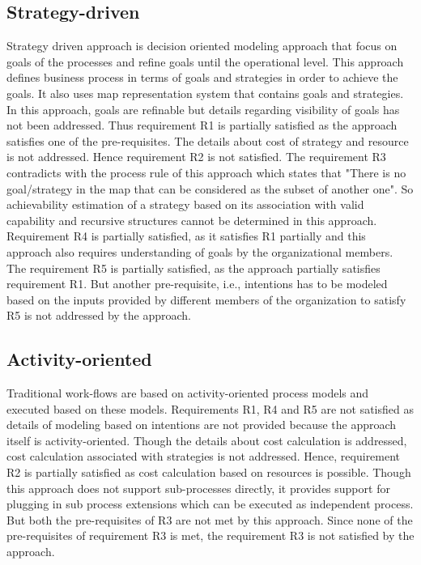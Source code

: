 \subsection{Strategy-driven} 
Strategy driven approach is decision oriented modeling approach that focus on goals of the processes and refine goals until the operational level. This approach defines business process in terms of goals and strategies in order to achieve the goals. It also uses map representation system that contains goals and strategies. In this approach, goals are refinable but details regarding visibility of goals has not been addressed. Thus requirement R1 is partially satisfied as the approach satisfies one of the pre-requisites. The details about cost of strategy and resource is not addressed. Hence requirement R2 is not satisfied. The requirement R3 contradicts with the process rule of this approach which states that "There is no goal/strategy in the map that can be considered as the subset of another one". So achievability estimation of a strategy based on its association with valid capability and recursive structures cannot be determined in this approach. Requirement R4 is partially satisfied, as it satisfies R1 partially and this approach also requires understanding of goals by the organizational members. The requirement R5 is partially satisfied, as the approach partially satisfies requirement R1. But another pre-requisite, i.e., intentions has to be modeled based on the inputs provided by different members of the organization to satisfy R5 is not addressed by the approach. 

\subsection{Activity-oriented} 
Traditional work-flows are based on activity-oriented process models and executed based on these models. Requirements R1, R4 and R5 are not satisfied as details of modeling based on intentions are not provided because the approach itself is activity-oriented. Though the details about cost calculation is addressed, cost calculation associated with strategies is not addressed. Hence, requirement R2 is partially satisfied as cost calculation based on resources is possible. Though this approach does not support sub-processes directly, it provides support for plugging in sub process extensions which can be executed as independent process. But both the pre-requisites of R3 are not met by this approach. Since none of the pre-requisites of requirement R3 is met, the requirement R3 is not satisfied by the approach. 


